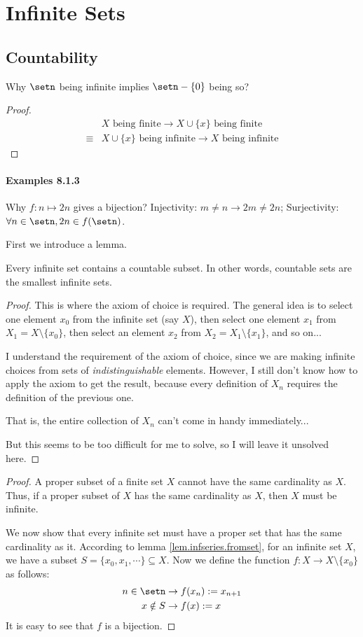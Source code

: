 \section{Infinite Sets}
\subsection{Countability}
Why $\setn$ being infinite implies $\setn - \{0\}$ being so?
\begin{proof}
\begin{align*}
&X \text{ being finite} \to X \cup \{x\} \text{ being finite} \tag{3.6.14(a)} \\
\equiv &X \cup \{x\} \text{ being infinite} \to X  \text{ being infinite}
\end{align*}
\end{proof}

\paragraph{Examples 8.1.3}
Why $f: n \mapsto 2n$ gives a bijection? Injectivity: $m \ne n \to 2m \ne 2n$; Surjectivity: $\forall n \in \setn, 2n \in f(\setn)$.

First we introduce a lemma.
\begin{lem}\label{lem.infseries.fromset}
Every infinite set contains a countable subset. In other words, countable sets are the smallest infinite sets.
\end{lem}
\begin{proof}
This is where the axiom of choice is required. The general idea is to select one element $x_0$ from the infinite set (say $X$), then select one element  $x_1$ from $X_1 = X \setminus \{x_0\}$, then select an element $x_2$ from $X_2 = X_1 \setminus \{x_1\}$, and so on...

I understand the requirement of the axiom of choice, since we are making infinite choices from sets of \emph{indistinguishable} elements. However, I still don't know how to apply the axiom to get the result, because every definition of $X_n$ requires the definition of the previous one.

That is, the entire collection of $X_n$ can't come in handy immediately...

But this seems to be too difficult for me to solve, so I will leave it unsolved here.
\end{proof}
\begin{proof}
A proper subset of a finite set $X$ cannot have the same cardinality as $X$. Thus, if a proper subset of $X$ has the same cardinality as $X$, then $X$ must be infinite.

We now show that every infinite set must have a proper set that has the same cardinality as it. According to lemma \ref{lem.infseries.fromset}, for an infinite set $X$, we have a subset 
$S = \{x_0,x_1,\cdots\} \subseteq X$. Now we define the function $f: X \to X \setminus \{x_0\}$ as follows:
\begin{align*}
n \in \setn &\to f(x_n) := x_{n+1} \\
x \notin S &\to f(x):=x
\end{align*}
It is easy to see that $f$ is a bijection. 
\end{proof}


